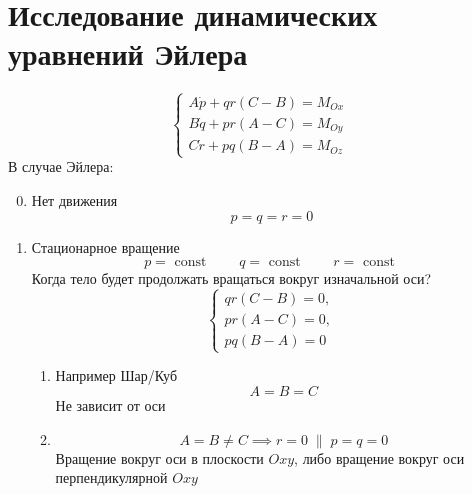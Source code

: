 \documentclass[crop=false]{standalone}
\begin{document}
\section{Исследование динамических уравнений Эйлера}
\[
\begin{cases}
    A \dot p + q r (C - B) = M_{O x} \\
    B \dot q + p r (A - C)= M_{O y} \\
    C \dot r + p q ( B - A) = M_{O z}
\end{cases}
\]
В случае Эйлера:
\begin{enumerate}
     \setcounter{enumi}{-1}
    \item Нет движения
    \[p = q = r = 0\]
    \item 
    Стационарное вращение
    \[p = \text{ const } \qquad q =\text{ const } \qquad r = \text{ const }\]
    Когда тело будет продолжать вращаться вокруг изначальной оси?
    \[\begin{cases}
        q r (C - B) = 0,\\
        p r ( A - C) = 0, \\
        pq (B - A) = 0
    \end{cases}\]
    \begin{enumerate}
        \item Например Шар/Куб \[A = B = C\]
        Не зависит от оси

        \item
        \[A = B \neq C \implies r = 0 \; \| \; p = q = 0\]
        Вращение вокруг оси в плоскости $Oxy$, либо вращение вокруг оси перпендикулярной $Oxy$


\end{enumerate}
\end{enumerate}
\end{document}

